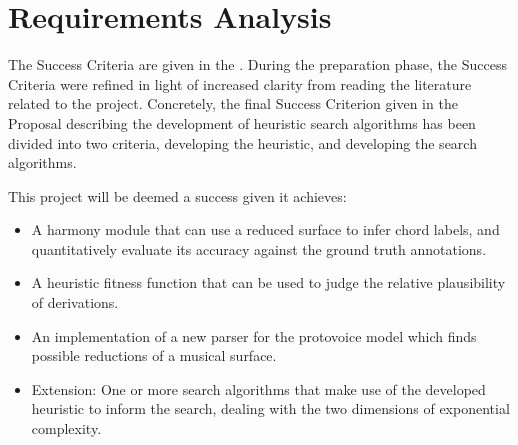 \documentclass[12pt,a4paper,twoside,openany]{report} \usepackage[pdfborder={0 0 0}]{hyperref}    %
\DeclareMathOperator*{\argmax}{arg\,max} \DeclareMathOperator*{\argmin}{arg\,min}
\theoremstyle{definition} \newtheorem{definition}{Definition}[section]
\begin{document}

%
%

\section{Requirements Analysis}
\label{sec:requirementsAnalysis}
The Success Criteria are given in the . During the preparation phase, the Success Criteria were
refined in light of increased clarity from reading the literature related to the project. Concretely, the final Success
Criterion given in the Proposal describing the development of heuristic search algorithms has been divided into two
criteria, developing the heuristic, and developing the search algorithms.

This project will be deemed a success given it achieves: 
\begin{itemize} 
  \item A harmony module that can use a reduced surface to infer chord labels, and quantitatively evaluate its accuracy against the ground truth annotations. 
  \item A heuristic fitness function that can be used to judge the relative plausibility of derivations. 
  \item An implementation of a new parser for the protovoice model which finds possible reductions of a musical surface. 
  \item Extension: One or more search algorithms that make use of the developed heuristic to inform the search, dealing with the two dimensions of exponential complexity. 
\end{itemize} 
\end{document}
